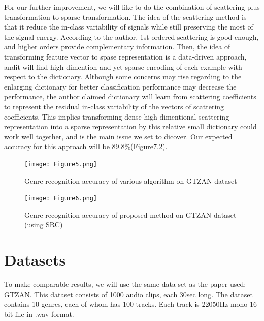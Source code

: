 \documentclass[final]{siamltexmm}
\begin{document}
For our further improvement, we will like to do the combination of scattering plus transformation to sparse transformation. The idea of the scattering method is that it reduce the in-class variability of signals while still preserving the most of the signal energy. According to the author, 1st-ordered scattering is good enough, and higher orders provide complementary information.  Then, the idea of transforming feature vector to spase representation is a data-driven approach, andit will find high dimention and yet sparse encoding of each example with respect to the dictionary. Although some concerns may rise regarding to the enlarging dictionary for better classification performance may decrease the performance, the author claimed dictionary will learn from scattering coefficients to represent the residual in-class variability of the vectors of scattering coefficients. This implies transforming dense high-dimentional scattering representation into a sparse representation by this relative small dictionary could work well together, and is the main issue we set to dicover. Our expected accuracy for this approach will be 89.8\%(Figure7.2).

\begin{figure}[ht]
\begin{center}
  \texttt{[image: Figure5.png]}
  \caption{Genre recognition accuracy of various algorithm on  GTZAN dataset}
  \label{fig5}
\end{center}
\end{figure}

\begin{figure}[ht]
\begin{center}
  \texttt{[image: Figure6.png]}
  \caption{Genre recognition accuracy of proposed method on  GTZAN dataset (using SRC)}
  \label{fig6}
\end{center}
\end{figure}

\section{Datasets}
To make comparable results, we will use the same data set as the paper used: GTZAN.  This dataset consists of 1000 audio clips, each 30sec long.  The dataset contains 10 genres, each of whom has 100 tracks.  Each track is 22050Hz mono 16-bit file in .wav format.
\end{document}

